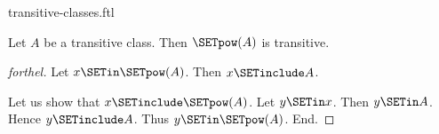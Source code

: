 \documentclass{stex}
\begin{document}
\begin{smodule}{transitive-classes.ftl}
\begin{proposition}[forthel,id=SET_THEORY_01_6995689103949824]
  Let $A$ be a transitive class.
  Then $\SETpow(A)$ is transitive.
\end{proposition}
\begin{proof}[forthel]
  Let $x \SETin \SETpow(A)$.
  Then $x \SETinclude A$.

  Let us show that $x \SETinclude \SETpow(A)$.
    Let $y \SETin x$.
    Then $y \SETin A$.
    Hence $y \SETinclude A$.
    Thus $y \SETin \SETpow(A)$.
  End.
\end{proof}
\end{smodule}
\end{document}
